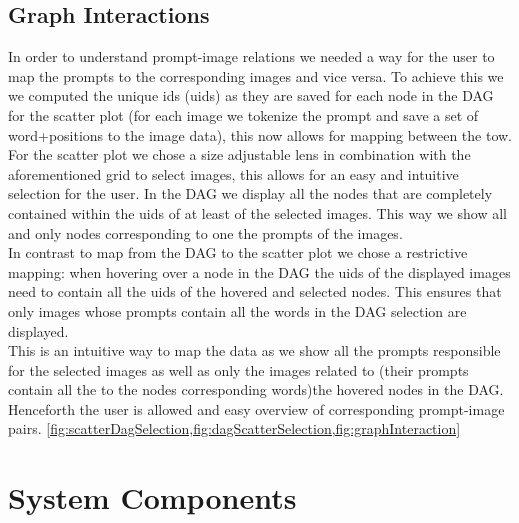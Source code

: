\documentclass[
  a4paper,  %
  twoside,  %
  bibliography=totoc,
  headsepline,
  cleardoublepage=empty,
  parskip=half,
  draft=false
]{scrbook}
\begin{document}
\subsection{Graph Interactions}
In order to understand prompt-image relations we needed a way for the user to map the prompts to the corresponding images and vice versa. To achieve this we we computed the unique ids (uids) as they are saved for each node in the DAG for the scatter plot (for each image we tokenize the prompt and save a set of word+positions to the image data), this now allows for mapping between the tow.\\
For the scatter plot we chose a size adjustable lens in combination with the aforementioned grid to select images, this allows for an easy and intuitive selection for the user. In the DAG we display all the nodes that are completely contained within the uids of at least of the selected images. This way we show all and only nodes corresponding to one the prompts of the images.\\ In contrast to map from the DAG to the scatter plot we chose a restrictive mapping: when hovering over a node in the DAG the uids of the displayed images need to contain all the uids of the hovered and selected nodes. This ensures that only images whose prompts contain all the words in the DAG selection are displayed.\\ This is an intuitive way to map the data as we show all the prompts responsible for the selected images as well as only the images related to (their prompts contain all the to the nodes corresponding words)the hovered nodes in the DAG. Henceforth the user is allowed and easy overview of corresponding prompt-image pairs. \cref{fig:scatterDagSelection,fig:dagScatterSelection,fig:graphInteraction}
\section{System Components}
\end{document}
